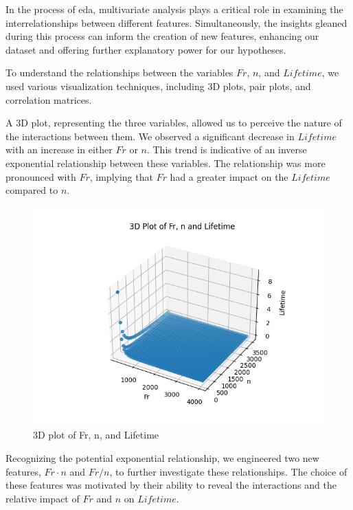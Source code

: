 In the process of \ac{eda}, multivariate analysis plays a critical role in examining the interrelationships between different features. Simultaneously, the insights gleaned during this process can inform the creation of new features, enhancing our dataset and offering further explanatory power for our hypotheses.

To understand the relationships between the variables $Fr$, $n$, and $Lifetime$, we used various visualization techniques, including 3D plots, pair plots, and correlation matrices.

A 3D plot, representing the three variables, allowed us to perceive the nature of the interactions between them. We observed a significant decrease in $Lifetime$ with an increase in either $Fr$ or $n$. This trend is indicative of an inverse exponential relationship between these variables. The relationship was more pronounced with $Fr$, implying that $Fr$ had a greater impact on the $Lifetime$ compared to $n$.

\begin{figure}[ht]
    \centering
    \includegraphics[width=\textwidth]{assets/bearings-eda/3dplot.png}
    \caption{3D plot of Fr, n, and Lifetime}
    \label{fig:bearings-3dplot}
\end{figure}

Recognizing the potential exponential relationship, we engineered two new features, $Fr \cdot n$ and $Fr/n$, to further investigate these relationships. The choice of these features was motivated by their ability to reveal the interactions and the relative impact of $Fr$ and $n$ on $Lifetime$.

